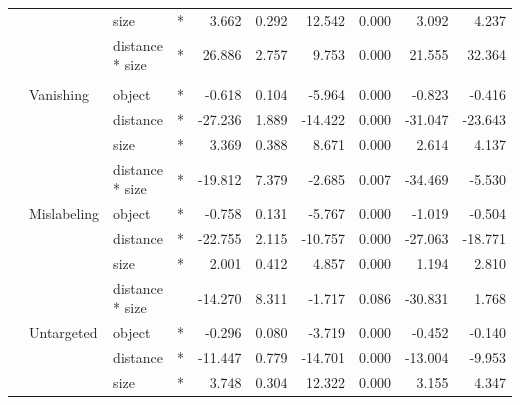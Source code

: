 \begin{longtable}[t]{llllrrrrrr}
\cmidrule{3-10}\nopagebreak
\hspace{1em} &  & size & * & 3.662 & 0.292 & 12.542 & 0.000 & 3.092 & 4.237\\
\cmidrule{3-10}\nopagebreak
\hspace{1em} &  & distance * size & * & 26.886 & 2.757 & 9.753 & 0.000 & 21.555 & 32.364\\
\cmidrule{1-10}\pagebreak[0]
\addlinespace[0.3em]
\multicolumn{10}{l}{\textbf{Faster R-CNN}}\\
\hspace{1em} & Vanishing & object & * & -0.618 & 0.104 & -5.964 & 0.000 & -0.823 & -0.416\\
\cmidrule{3-10}\nopagebreak
\hspace{1em} &  & distance & * & -27.236 & 1.889 & -14.422 & 0.000 & -31.047 & -23.643\\
\cmidrule{3-10}\nopagebreak
\hspace{1em} &  & size & * & 3.369 & 0.388 & 8.671 & 0.000 & 2.614 & 4.137\\
\cmidrule{3-10}\nopagebreak
\hspace{1em} &  & distance * size & * & -19.812 & 7.379 & -2.685 & 0.007 & -34.469 & -5.530\\
\cmidrule{2-10}\nopagebreak
\hspace{1em} & Mislabeling & object & * & -0.758 & 0.131 & -5.767 & 0.000 & -1.019 & -0.504\\
\cmidrule{3-10}\nopagebreak
\hspace{1em} &  & distance & * & -22.755 & 2.115 & -10.757 & 0.000 & -27.063 & -18.771\\
\cmidrule{3-10}\nopagebreak
\hspace{1em} &  & size & * & 2.001 & 0.412 & 4.857 & 0.000 & 1.194 & 2.810\\
\cmidrule{3-10}\nopagebreak
\hspace{1em} &  & distance * size &  & -14.270 & 8.311 & -1.717 & 0.086 & -30.831 & 1.768\\
\cmidrule{2-10}\nopagebreak
\hspace{1em} & Untargeted & object & * & -0.296 & 0.080 & -3.719 & 0.000 & -0.452 & -0.140\\
\cmidrule{3-10}\nopagebreak
\hspace{1em} &  & distance & * & -11.447 & 0.779 & -14.701 & 0.000 & -13.004 & -9.953\\
\cmidrule{3-10}\nopagebreak
\hspace{1em} &  & size & * & 3.748 & 0.304 & 12.322 & 0.000 & 3.155 & 4.347\\

\end{longtable}
